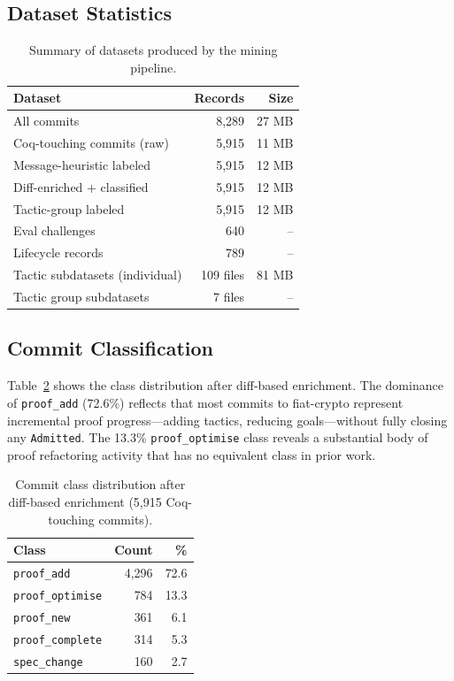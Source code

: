 \documentclass[11pt]{article}
\begin{document}
\subsection{Dataset Statistics}

\begin{table}[h]
\centering
\caption{Summary of datasets produced by the mining pipeline.}
\label{tab:datasets}
\begin{tabular}{lrr}
\toprule
Dataset & Records & Size \\
\midrule
All commits & 8,289 & 27 MB \\
Coq-touching commits (raw) & 5,915 & 11 MB \\
Message-heuristic labeled & 5,915 & 12 MB \\
Diff-enriched + classified & 5,915 & 12 MB \\
Tactic-group labeled & 5,915 & 12 MB \\
Eval challenges & 640 & -- \\
Lifecycle records & 789 & -- \\
Tactic subdatasets (individual) & 109 files & 81 MB \\
Tactic group subdatasets & 7 files & -- \\
\bottomrule
\end{tabular}
\end{table}

\subsection{Commit Classification}

Table~\ref{tab:classes} shows the class distribution after diff-based enrichment. The dominance of \texttt{proof\_add} (72.6\%) reflects that most commits to fiat-crypto represent incremental proof progress---adding tactics, reducing goals---without fully closing any \texttt{Admitted}. The 13.3\% \texttt{proof\_optimise} class reveals a substantial body of proof refactoring activity that has no equivalent class in prior work.

\begin{table}[h]
\centering
\caption{Commit class distribution after diff-based enrichment (5,915 Coq-touching commits).}
\label{tab:classes}
\begin{tabular}{lrr}
\toprule
Class & Count & \% \\
\midrule
\texttt{proof\_add} & 4,296 & 72.6 \\
\texttt{proof\_optimise} & 784 & 13.3 \\
\texttt{proof\_new} & 361 & 6.1 \\
\texttt{proof\_complete} & 314 & 5.3 \\
\texttt{spec\_change} & 160 & 2.7 \\
\bottomrule
\end{tabular}
\end{table}
\end{document}

